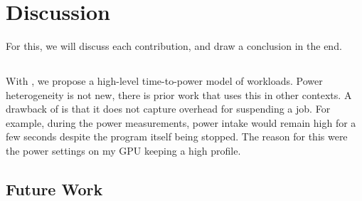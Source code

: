 \chapter{Discussion} \label{sec:discussion}

For this, we will discuss each contribution, and draw a conclusion in the end.

\section{\modelname{}}

With \modelname{}, we propose a high-level time-to-power model of workloads.
Power heterogeneity is not new, there is prior work that uses this in other contexts.
A drawback of \modelname{} is that it does not capture overhead for suspending a job. 
For example, during the power measurements, power intake would remain high for a few seconds despite the program itself being stopped.
The reason for this were the power settings on my GPU keeping a high profile.

\section{\programname{}}
\section{Future Work} \label{sec:future_work}


